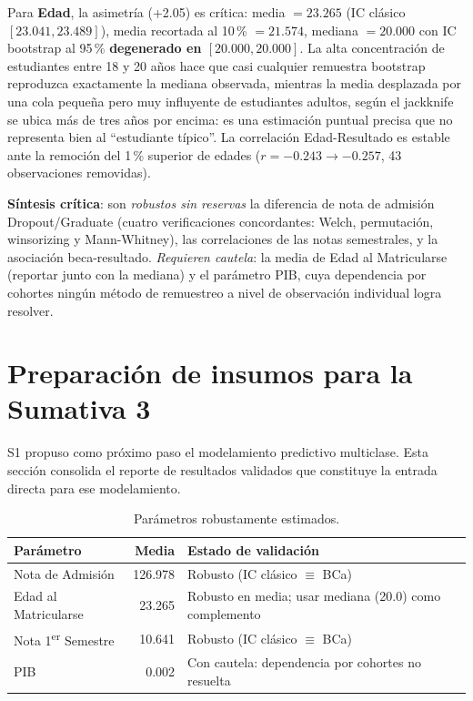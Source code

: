 \documentclass[11pt,a4paper]{article}
\begin{document}
Para \textbf{Edad}, la asimetría (+2.05) es crítica: media $=23.265$ (IC clásico
$[23.041,23.489]$), media recortada al 10\,\% $=21.574$, mediana $=20.000$ con IC bootstrap al
95\,\% \textbf{degenerado en $[20.000,20.000]$}. La alta concentración de estudiantes entre 18
y 20 años hace que casi cualquier remuestra bootstrap reproduzca exactamente la mediana
observada, mientras la media desplazada por una cola pequeña pero muy influyente de
estudiantes adultos, según el jackknife se ubica más de tres años por encima: es una
estimación puntual precisa que no representa bien al ``estudiante típico''. La correlación
Edad-Resultado es estable ante la remoción del 1\,\% superior de edades ($r=-0.243\to-0.257$,
43 observaciones removidas).

\textbf{Síntesis crítica}: son \emph{robustos sin reservas} la diferencia de nota de admisión
Dropout/Graduate (cuatro verificaciones concordantes: Welch, permutación, winsorizing y
Mann-Whitney), las correlaciones de las notas semestrales, y la asociación beca-resultado.
\emph{Requieren cautela}: la media de Edad al Matricularse (reportar junto con la mediana) y
el parámetro PIB, cuya dependencia por cohortes ningún método de remuestreo a nivel de
observación individual logra resolver.

\section{Preparación de insumos para la Sumativa 3}

\begin{conexionbox}
S1 propuso como próximo paso el modelamiento predictivo multiclase. Esta sección consolida el
reporte de resultados validados que constituye la entrada directa para ese modelamiento.
\end{conexionbox}

\begin{table}[h!]
\centering
\small
\begin{tabular}{lrl}
\toprule
\textbf{Parámetro} & \textbf{Media} & \textbf{Estado de validación} \\
\midrule
Nota de Admisión        & 126.978 & Robusto (IC clásico $\equiv$ BCa) \\
Edad al Matricularse    & 23.265  & Robusto en media; usar mediana (20.0) como complemento \\
Nota 1\textsuperscript{er} Semestre & 10.641 & Robusto (IC clásico $\equiv$ BCa) \\
PIB                     & 0.002   & Con cautela: dependencia por cohortes no resuelta \\
\bottomrule
\end{tabular}
\caption{Parámetros robustamente estimados.}
\label{tab:resumen_param}
\end{table}
\end{document}
